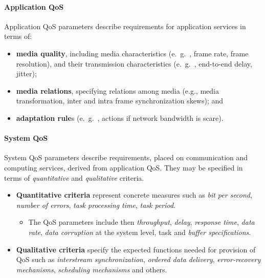 \paragraph*{Application QoS}
Application QoS parameters describe requirements for application services in terms of:
\begin{itemize}
	\item \textbf{media quality}, including media characteristics (e.\ g.\ , frame rate, frame resolution), and their transmission characteristics (e.\ g.\ , end-to-end delay, jitter); 
	
	\item \textbf{media relations}, specifying relations among media (e.g., media transformation, inter and intra frame synchronization skews); and
	
	\item \textbf{adaptation rule}s (e.\ g.\ , actions if network bandwidth is scare).
\end{itemize}


\paragraph*{System QoS}
System QoS parameters describe requirements, placed on communication and computing services, derived from application QoS. They may be specified in terms of \textit{quantitative} and \textit{qualitative} criteria. 
\begin{itemize}
	\item \textbf{Quantitative criteria} represent concrete measures such as \textit{bit per second}, \textit{number of errors}, \textit{task processing time}, \textit{task period}. 
	\begin{itemize}
		\item The QoS parameters include then \textit{throughput}, \textit{delay}, \textit{response time},\textit{ data rate}, \textit{data corruption} at the system level, task and \textit{buffer specifications}. 
	\end{itemize}
		\item \textbf{Qualitative criteria} specify the expected functions needed for provision of QoS such as \textit{interstream} \textit{synchronization}, \textit{ordered data delivery},\textit{ error-recovery mechanisms}, \textit{scheduling mechanisms} and others.
\end{itemize}

